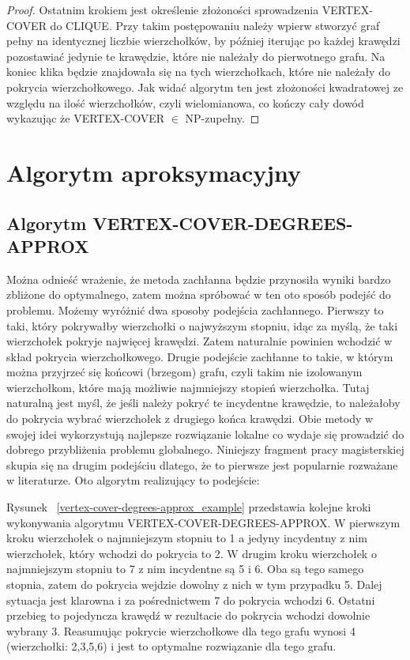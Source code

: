 \begin{proof}
Ostatnim krokiem jest określenie złożoności sprowadzenia VERTEX-COVER do CLIQUE. Przy takim postępowaniu należy wpierw stworzyć graf pełny na identycznej liczbie wierzchołków, by później iterując po każdej krawędzi pozostawiać jedynie te krawędzie, które nie należały do pierwotnego grafu. Na koniec klika będzie znajdowała się na tych wierzchołkach, które nie należały do pokrycia wierzchołkowego. Jak widać algorytm ten jest złożoności kwadratowej ze względu na ilość wierzchołków, czyli wielomianowa, co kończy cały dowód wykazując że VERTEX-COVER $\in$ NP-zupełny.
\end{proof}

\section{Algorytm aproksymacyjny}

\subsection{Algorytm VERTEX-COVER-DEGREES-APPROX}

	Można odnieść wrażenie, że metoda zachłanna będzie przynosiła wyniki bardzo zbliżone do optymalnego, zatem można spróbować w ten oto sposób podejść do problemu. Możemy wyróżnić dwa sposoby podejścia zachłannego. Pierwszy to taki, który pokrywałby wierzchołki o najwyższym stopniu, idąc za myślą, że taki wierzchołek pokryje najwięcej krawędzi. Zatem naturalnie powinien wchodzić w skład pokrycia wierzchołkowego. Drugie podejście zachłanne to takie, w którym można przyjrzeć się końcowi (brzegom) grafu, czyli takim nie izolowanym wierzchołkom, które mają możliwie najmniejszy stopień wierzchołka. Tutaj naturalną jest myśl, że jeśli należy pokryć te incydentne krawędzie, to należałoby do pokrycia wybrać wierzchołek z drugiego końca krawędzi. Obie metody w swojej idei wykorzystują najlepsze rozwiązanie lokalne co wydaje się prowadzić do dobrego przybliżenia problemu globalnego. Niniejszy fragment pracy magisterskiej skupia się na drugim podejściu dlatego, że to pierwsze jest popularnie rozważane w literaturze.
	Oto algorytm realizujący to podejście:



	Rysunek ~\ref{vertex-cover-degrees-approx_example} przedstawia kolejne kroki wykonywania algorytmu VERTEX-COVER-DEGREES-APPROX. W pierwszym kroku wierzchołek o najmniejszym stopniu to 1 a jedyny incydentny z nim wierzchołek, który wchodzi do pokrycia to 2. W drugim kroku wierzchołek o najmniejszym stopniu to 7 z nim incydentne są 5 i 6. Oba są tego samego stopnia, zatem do pokrycia wejdzie dowolny z nich w tym przypadku 5. Dalej sytuacja jest klarowna i za pośrednictwem 7 do pokrycia wchodzi 6. Ostatni przebieg to pojedyncza krawędź w rezultacie do pokrycia wchodzi dowolnie wybrany 3. Reasumując pokrycie wierzchołkowe dla tego grafu wynosi 4 (wierzchołki: 2,3,5,6) i jest to optymalne rozwiązanie dla tego grafu.
	
